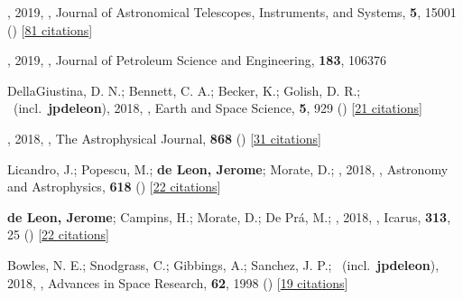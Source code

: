 \item[{\color{numcolor}\scriptsize93}] , 2019, , Journal of Astronomical Telescopes, Instruments, and Systems, \textbf{5}, 15001 () [\href{https://ui.adsabs.harvard.edu/abs/2019JATIS...5a5001N}{81 citations}]

\item[{\color{numcolor}\scriptsize92}] , 2019, , Journal of Petroleum Science and Engineering, \textbf{183}, 106376

\item[{\color{numcolor}\scriptsize91}] DellaGiustina, D. N.; Bennett, C. A.; Becker, K.; Golish, D. R.; \etal\ (incl.\ \textbf{jpdeleon}), 2018, , Earth and Space Science, \textbf{5}, 929 () [\href{https://ui.adsabs.harvard.edu/abs/2018E&SS....5..929D}{21 citations}]

\item[{\color{numcolor}\scriptsize90}] , 2018, , The Astrophysical Journal, \textbf{868} () [\href{https://ui.adsabs.harvard.edu/abs/2018ApJ...868L...3M}{31 citations}]

\item[{\color{numcolor}\scriptsize89}] Licandro, J.; Popescu, M.; \textbf{de Leon, Jerome}; Morate, D.; \etal, 2018, , Astronomy and Astrophysics, \textbf{618} () [\href{https://ui.adsabs.harvard.edu/abs/2018A&A...618A.170L}{22 citations}]

\item[{\color{numcolor}\scriptsize88}] \textbf{de Leon, Jerome}; Campins, H.; Morate, D.; De Pr{\'a}, M.; \etal, 2018, , Icarus, \textbf{313}, 25 () [\href{https://ui.adsabs.harvard.edu/abs/2018Icar..313...25D}{22 citations}]

\item[{\color{numcolor}\scriptsize87}] Bowles, N. E.; Snodgrass, C.; Gibbings, A.; Sanchez, J. P.; \etal\ (incl.\ \textbf{jpdeleon}), 2018, , Advances in Space Research, \textbf{62}, 1998 () [\href{https://ui.adsabs.harvard.edu/abs/2018AdSpR..62.1998B}{19 citations}]

